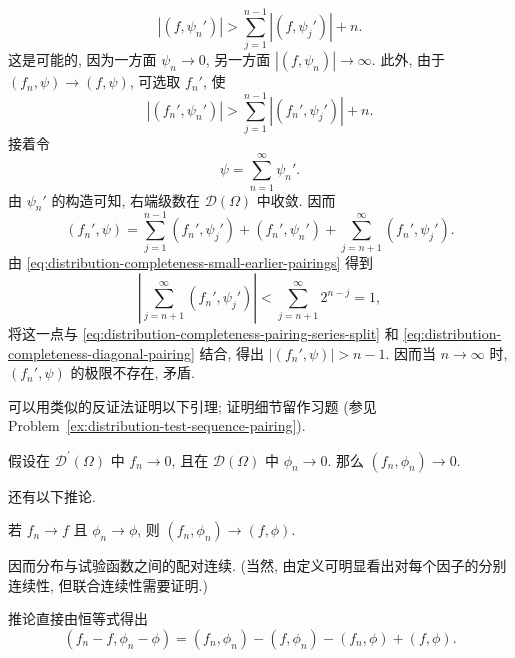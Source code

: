 \begin{Proof}
\begin{equation}\label{eq:distribution-completeness-large-limit-pairing}
|(f,\psi_n')|>\sum_{j=1}^{n-1}|(f,\psi_j')|+n.
\end{equation}
这是可能的, 因为一方面 $\psi_n\to0$, 另一方面 $|(f,\psi_n)|\to\infty$. 此外, 由于 $(f_n,\psi)\to(f,\psi)$, 可选取 $f_n'$, 使
\begin{equation}\label{eq:distribution-completeness-diagonal-pairing}
|(f_n',\psi_n')|>\sum_{j=1}^{n-1}|(f_n',\psi_j')|+n.
\end{equation}
接着令
\begin{equation}\label{eq:distribution-completeness-test-series}
\psi=\sum_{n=1}^{\infty}\psi_n'.
\end{equation}
由 $\psi_n'$ 的构造可知, 右端级数在 $\mathcal{D}(\Omega)$ 中收敛. 因而
\begin{equation}\label{eq:distribution-completeness-pairing-series-split}
(f_n',\psi)=\sum_{j=1}^{n-1}(f_n',\psi_j')+(f_n',\psi_n')+\sum_{j=n+1}^{\infty}(f_n',\psi_j').
\end{equation}
由 \eqref{eq:distribution-completeness-small-earlier-pairings} 得到
\begin{equation}\label{eq:distribution-completeness-tail-estimate}
\left|\sum_{j=n+1}^{\infty}(f_n',\psi_j')\right|<\sum_{j=n+1}^{\infty}2^{n-j}=1,
\end{equation}
将这一点与 \eqref{eq:distribution-completeness-pairing-series-split} 和 \eqref{eq:distribution-completeness-diagonal-pairing} 结合, 得出 $|(f_n',\psi)|>n-1$. 因而当 $n\to\infty$ 时, $(f_n',\psi)$ 的极限不存在, 矛盾.
\end{Proof}

可以用类似的反证法证明以下引理; 证明细节留作习题 (参见 Problem~\ref{ex:distribution-test-sequence-pairing}).

\begin{Lemma}
\label{lem:distribution-test-sequence-pairing}
假设在 $\mathcal{D}^{\prime}(\Omega)$ 中 $f_n\to0$, 且在 $\mathcal{D}(\Omega)$ 中 $\phi_n\to0$. 那么 $(f_n,\phi_n)\to0$.
\end{Lemma}

还有以下推论.

\begin{Corollary}
\label{cor:distribution-joint-continuity}
若 $f_n\to f$ 且 $\phi_n\to\phi$, 则 $(f_n,\phi_n)\to(f,\phi)$.
\end{Corollary}

因而分布与试验函数之间的配对连续. (当然, 由定义可明显看出对每个因子的分别连续性, 但联合连续性需要证明.)

\begin{Proof}
推论直接由恒等式得出
\begin{equation}\label{eq:distribution-joint-pairing-identity}
(f_n-f,\phi_n-\phi)=(f_n,\phi_n)-(f,\phi_n)-(f_n,\phi)+(f,\phi).
\end{equation}

\end{Proof}
